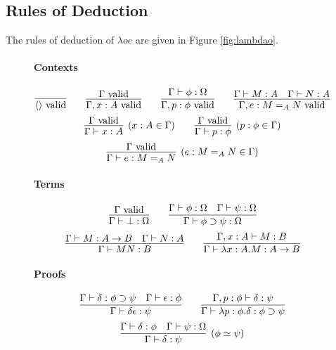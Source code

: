 
\subsection{Rules of Deduction}

The rules of deduction of $\lambda o e$ are given in Figure \ref{fig:lambdao}.

\newcommand{\RvarT}{\ensuremath(\mathsf{varT})}
\begin{figure}
\begin{framed}
\paragraph{Contexts}
\[ \infer{\langle \rangle \vald}{} \qquad
\infer{\Gamma, x : A \vald}{\Gamma \vald} \qquad 
\infer{\Gamma, p : \phi \vald}{\Gamma \vdash \phi : \Omega} \qquad
\infer{\Gamma, e : M =_A N \vald}{\Gamma \vdash M : A \quad \Gamma \vdash N : A} \]
\[ \infer[(x : A \in \Gamma)]{\Gamma \vdash x : A}{\Gamma \vald} \qquad
\infer[(p : \phi \in \Gamma)]{\Gamma \vdash p : \phi}{\Gamma \vald} \]
\[ \infer[(e : M =_A N \in \Gamma)]{\Gamma \vdash e : M =_A N}{\Gamma \vald} \]

\paragraph{Terms}
\[ \infer{\Gamma \vdash \bot : \Omega}{\Gamma \vald} \qquad
\infer{\Gamma \vdash \phi \supset \psi : \Omega}{\Gamma \vdash \phi : \Omega \quad \Gamma \vdash \psi : \Omega} \]
\[ \infer{\Gamma \vdash M N : B} {\Gamma \vdash M : A \rightarrow B \quad \Gamma \vdash N : A} \qquad
\infer{\Gamma \vdash \lambda x:A.M : A \rightarrow B}{\Gamma, x : A \vdash M : B} \]

\paragraph{Proofs}
\[ \infer{\Gamma \vdash \delta \epsilon : \psi} {\Gamma \vdash \delta : \phi \supset \psi \quad \Gamma \vdash \epsilon : \phi} \qquad
\infer{\Gamma \vdash \lambda p : \phi . \delta : \phi \supset \psi}{\Gamma, p : \phi \vdash \delta : \psi} \]
\[ \infer[(\phi \simeq \psi)]{\Gamma \vdash \delta : \psi}{\Gamma \vdash \delta : \phi \quad \Gamma \vdash \psi : \Omega} \]


\end{framed}
\end{figure}

